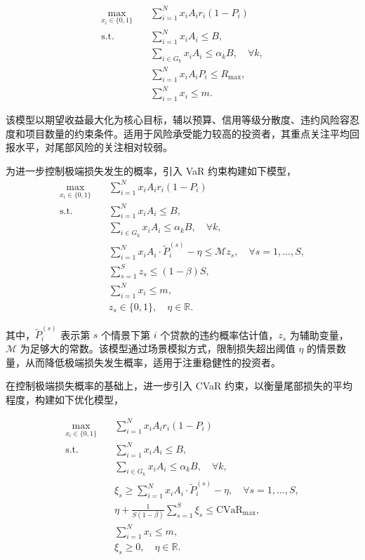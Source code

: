 \documentclass{write_paper}
\begin{document}
\begin{equation}
\begin{aligned}
\max_{x_i \in \{0,1\}} \quad & \sum_{i=1}^N x_i A_i  r_i(1 - P_i) \\
\text{s.t.} \quad
& \sum_{i=1}^N x_i A_i \le B, \\
& \sum_{i \in G_k} x_i A_i \le \alpha_k B, \quad \forall k, \\
& \sum_{i=1}^N x_i A_i P_i \le R_{\max}, \\
& \sum_{i=1}^N x_i \le m.
\end{aligned}
\label{eq:main_model}
\tag{P2P}
\end{equation}

该模型以期望收益最大化为核心目标，辅以预算、信用等级分散度、违约风险容忍度和项目数量的约束条件。适用于风险承受能力较高的投资者，其重点关注平均回报水平，对尾部风险的关注相对较弱。
 

为进一步控制极端损失发生的概率，引入 VaR 约束构建如下模型，
\begin{equation}
\begin{aligned}
\max_{x_i \in \{0,1\}} \quad & \sum_{i=1}^N x_i A_i  r_i(1 - P_i) \\
\text{s.t.} \quad
& \sum_{i=1}^N x_i A_i \le B, \\
& \sum_{i \in G_k} x_i A_i \le \alpha_k B, \quad \forall k, \\
& \sum_{i=1}^N x_i A_i \cdot \tilde{P}_i^{(s)} - \eta \le \mathcal{M} z_s, \quad \forall s = 1,\dots,S, \\
& \sum_{s=1}^S z_s \le (1 - \beta) S, \\
& \sum_{i=1}^N x_i \le m, \\
& z_s \in \{0,1\}, \quad \eta \in \mathbb{R}.
\end{aligned}
\label{eq:var_model}
\tag{P2P-VaR}
\end{equation}

其中，$\tilde{P}_i^{(s)}$ 表示第 $s$ 个情景下第 $i$ 个贷款的违约概率估计值，$z_s$ 为辅助变量，$\mathcal{M}$ 为足够大的常数。该模型通过场景模拟方式，限制损失超出阈值 $\eta$ 的情景数量，从而降低极端损失发生概率，适用于注重稳健性的投资者。
 

在控制极端损失概率的基础上，进一步引入 CVaR 约束，以衡量尾部损失的平均程度，构建如下优化模型，

\begin{equation}
\begin{aligned}
\max_{x_i \in \{0,1\}} \quad & \sum_{i=1}^N x_i A_i r_i(1 - P_i) \\
\text{s.t.} \quad
& \sum_{i=1}^N x_i A_i \le B, \\
& \sum_{i \in G_k} x_i A_i \le \alpha_k B, \quad \forall k, \\
& \xi_s \ge \sum_{i=1}^N x_i A_i \cdot \tilde{P}_i^{(s)} - \eta, \quad \forall s = 1,\dots,S, \\
& \eta + \frac{1}{S(1 - \beta)} \sum_{s=1}^S \xi_s \le \text{CVaR}_{\max}, \\
& \sum_{i=1}^N x_i \le m, \\
& \xi_s \ge 0, \quad \eta \in \mathbb{R}.
\end{aligned}
\label{eq:cvar_model}
\tag{P2P-CVaR}
\end{equation}
\end{document}
